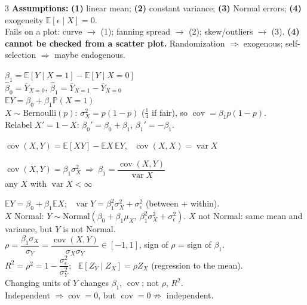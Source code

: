 \documentclass[11pt]{article}
\newcommand{\E}{\mathbb{E}}
\newcommand{\Var}{\operatorname{var}}
\newcommand{\Cov}{\operatorname{cov}}
\renewcommand{\P}{\mathbb{P}}
\newcommand{\given}{\mid}
\newcommand{\Bern}{\text{Bernoulli}}
\newcommand{\Norm}{\text{Normal}}
\begin{document}
\begin{landscape}
\begin{multicols}{3}
\textbf{Assumptions:} \textbf{(1)} linear mean; \textbf{(2)} constant variance; \textbf{(3)} Normal errors; \textbf{(4)} exogeneity $\E[\epsilon\given X]=0$.\\
Fails on a plot: curve $\to$ (1); fanning spread $\to$ (2); skew/outliers $\to$ (3). \textbf{(4) cannot be checked from a scatter plot.} Randomization $\Rightarrow$ exogenous; self-selection $\Rightarrow$ maybe endogenous.

\columnbreak

$\beta_1=\E[Y\given X{=}1]-\E[Y\given X{=}0]$\\
$\hat\beta_0=\bar Y_{X=0}$, \quad $\hat\beta_1=\bar Y_{X=1}-\bar Y_{X=0}$\\
$\E Y=\beta_0+\beta_1\P(X{=}1)$\\
$X\sim\Bern(p)$: $\sigma_X^2=p(1-p)$ ($\tfrac14$ if fair), so $\Cov=\beta_1p(1-p)$.\\
Relabel $X'=1-X$: $\beta_0'=\beta_0+\beta_1$, $\beta_1'=-\beta_1$.

$\Cov(X,Y)=\E[XY]-\E X\,\E Y$, \ $\Cov(X,X)=\Var X$
\begin{cbox}
$\Cov(X,Y)=\beta_1\sigma_X^2\ \Rightarrow\ \beta_1=\dfrac{\Cov(X,Y)}{\Var X}$\\
{\scriptsize any $X$ with $\Var X<\infty$}
\end{cbox}
$\E Y=\beta_0+\beta_1\E X$; \ $\Var Y=\beta_1^2\sigma_X^2+\sigma_\epsilon^2$ (between + within).\\
$X$ Normal: $Y\sim\Norm(\beta_0+\beta_1\mu_X,\ \beta_1^2\sigma_X^2+\sigma_\epsilon^2)$. $X$ not Normal: same mean and variance, but $Y$ is not Normal.\\
$\rho=\dfrac{\beta_1\sigma_X}{\sigma_Y}=\dfrac{\Cov(X,Y)}{\sigma_X\sigma_Y}\in[-1,1]$, sign of $\rho$ = sign of $\beta_1$.\\
$R^2=\rho^2=1-\dfrac{\sigma_\epsilon^2}{\sigma_Y^2}$; \ $\E[Z_Y\given Z_X]=\rho Z_X$ (regression to the mean).\\
Changing units of $Y$ changes $\beta_1$, $\Cov$; not $\rho$, $R^2$.\\
Independent $\Rightarrow\Cov=0$, but $\Cov=0\not\Rightarrow$ independent.


\end{multicols}
\end{landscape}
\end{document}
